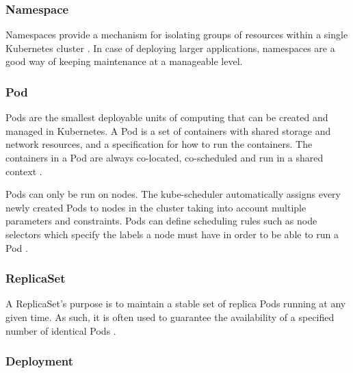 \subsubsection{Namespace}

Namespaces provide a mechanism for isolating groups of resources within a single Kubernetes cluster \cite{KubernetesNamespace}. In case of deploying larger applications, namespaces are a good way of keeping maintenance at a manageable level.

\subsubsection{Pod} \label{k8s-pod}

Pods are the smallest deployable units of computing that can be created and managed in Kubernetes. A Pod is a set of containers with shared storage and network resources, and a specification for how to run the containers. The containers in a Pod are always co-located, co-scheduled and run in a shared context \cite{KubernetesPod}.

Pods can only be run on nodes. The kube-scheduler automatically assigns every newly created Pods to nodes in the cluster taking into account multiple parameters and constraints. Pods can define scheduling rules such as node selectors which specify the labels a node must have in order to be able to run a Pod \cite{KubernetesNodeSelector}.

\subsubsection{ReplicaSet}

A ReplicaSet's purpose is to maintain a stable set of replica Pods running at any given time. As such, it is often used to guarantee the availability of a specified number of identical Pods \cite{KubernetesReplicaSet}.

\subsubsection{Deployment}

